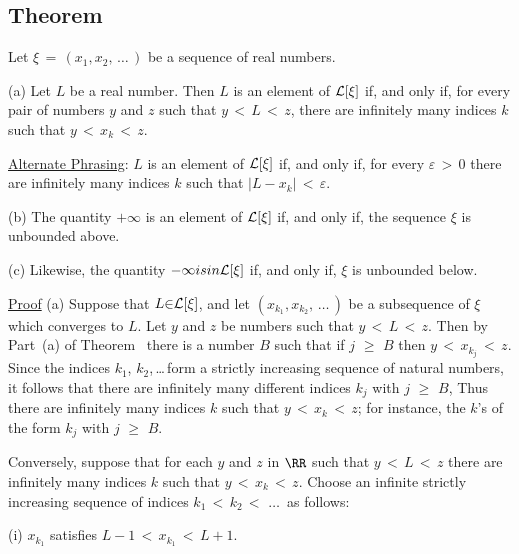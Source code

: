 {            \subsection{\small{\bf Theorem}}
            \label{ThmC50.100}

        Let ${\xi} \,=\, (x_{1},x_{2},\,{\ldots}\,)$ be a sequence of real numbers.

\V

        (a) Let $L$ be a real number. Then $L$ is an element of ${\cal L}[{\xi}]$ if, and only if, for every pair of numbers $y$ and $z$ such that $y\,<\,L\,<\,z$, there are infinitely many indices $k$ such that $y\,<\,x_{k}\,<\,z$.

        \underline{Alternate Phrasing}: $L$ is an element of ${\cal L}[{\xi}]$ if, and only if, for every ${\varepsilon}\,>\,0$ there are infinitely many indices $k$ such that $|L-x_{k}|\,<\,{\varepsilon}$.

\V

        (b) The quantity $+{\infty}$ is an element of ${\cal L}[{\xi}]$ if, and only if, the sequence ${\xi}$ is unbounded above.


\V
        (c) Likewise, the quantity $-{\infty} is in {\cal L}[{\xi}]$ if, and only if, ${\xi}$ is unbounded below.


\V

        \underline{Proof} (a) Suppose that $L{\in}{\cal L}[{\xi}]$, and let $(x_{k_{1}},x_{k_{2}},\,{\ldots}\,)$ be a subsequence of ${\xi}$ which converges to $L$.
    Let $y$ and $z$ be numbers such that $y\,<\,L\,<\,z$. Then by Part~(a) of Theorem~ there is a number $B$ such that if $j\,\,{\geq}\,\,B$ then $y\,<\,x_{k_{j}}\,<\,z$.
    Since the indices $k_{1}$, $k_{2}$,\,{\ldots}\,form a strictly increasing sequence of natural numbers, it follows that there are infinitely many different indices $k_{j}$ with $j\,\,{\geq}\,\,B$,
    Thus there are infinitely many indices $k$ such that $y\,<\,x_{k}\,<\,z$; for instance, the $k$'s of the form $k_{j}$ with $j\,\,{\geq}\,\,B$.

        Conversely, suppose that for each $y$ and $z$ in ${\RR}$ such that $y\,<\,L\,<\,z$ there are infinitely many indices $k$ such that $y\,<\,x_{k}\,<\,z$.
    Choose an infinite strictly increasing sequence of indices $k_{1}\,<\,k_{2}\,<\,\,{\ldots}\,$ as follows:

        (i) $x_{k_{1}}$ satisfies $L-1\,<\,x_{k_{1}}\,<\,L+1$.

}
